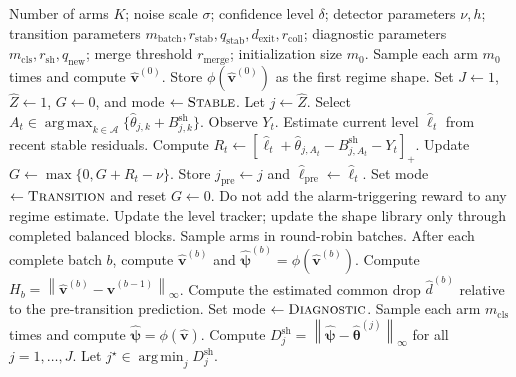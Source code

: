 \documentclass[11pt]{article}
\newcommand{\A}{\mathcal A}
\newcommand{\norm}[1]{\left\lVert #1 \right\rVert}
\newcommand{\pos}[1]{\left[#1\right]_{+}}
\DeclareMathOperator*{\argmax}{arg\,max}
\DeclareMathOperator*{\argmin}{arg\,min}
\begin{document}
\begin{algorithm}[t]
\caption{Level-Invariant Transition-Aware Recurrent UCB (LI-TAR-UCB)}
\label{alg:li_tar_ucb}
\begin{algorithmic}[1]
\Require Number of arms $K$; noise scale $\sigma$; confidence level $\delta$; detector parameters $\nu,h$; transition parameters $m_{\mathrm{batch}},r_{\mathrm{stab}},q_{\mathrm{stab}},d_{\mathrm{exit}},r_{\mathrm{coll}}$; diagnostic parameters $m_{\mathrm{cls}},r_{\mathrm{sh}},q_{\mathrm{new}}$; merge threshold $r_{\mathrm{merge}}$; initialization size $m_0$.
\State Sample each arm $m_0$ times and compute $\widehat{\bm v}^{(0)}$.
\State Store $\phi(\widehat{\bm v}^{(0)})$ as the first regime shape.
\State Set $J\gets 1$, $\widehat Z\gets 1$, $G\gets 0$, and mode $\gets\textsc{Stable}$.
        \State Let $j\gets\widehat Z$.
        \State Select $A_t\in\argmax_{k\in\A}\{\widehat\theta_{j,k}+B_{j,k}^{\mathrm{sh}}\}$.
        \State Observe $Y_t$.
        \State Estimate current level $\widehat\ell_t$ from recent stable residuals.
        \State Compute $R_t\gets\pos{\widehat\ell_t+\widehat\theta_{j,A_t}-B_{j,A_t}^{\mathrm{sh}}-Y_t}$.
        \State Update $G\gets\max\{0,G+R_t-\nu\}$.
            \State Store $j_{\mathrm{pre}}\gets j$ and $\widehat\ell_{\mathrm{pre}}\gets\widehat\ell_t$.
            \State Set mode $\gets\textsc{Transition}$ and reset $G\gets0$.
            \State Do not add the alarm-triggering reward to any regime estimate.
        \Else
            \State Update the level tracker; update the shape library only through completed balanced blocks.
        \EndIf
        \State Sample arms in round-robin batches.
        \State After each complete batch $b$, compute $\widehat{\bm v}^{(b)}$ and $\widehat{\bm\psi}^{(b)}=\phi(\widehat{\bm v}^{(b)})$.
        \State Compute $H_b=\norm{\widehat{\bm v}^{(b)}-\widehat{\bm v}^{(b-1)}}_{\infty}$.
        \State Compute the estimated common drop $\widehat d^{(b)}$ relative to the pre-transition prediction.
            \State Set mode $\gets\textsc{Diagnostic}$.
        \EndIf
        \State Sample each arm $m_{\mathrm{cls}}$ times and compute $\widehat{\bm\psi}=\phi(\widehat{\bm v})$.
        \State Compute $D_j^{\mathrm{sh}}=\norm{\widehat{\bm\psi}-\widehat{\bm\theta}^{(j)}}_{\infty}$ for all $j=1,\ldots,J$.
        \State Let $j^\star\in\argmin_j D_j^{\mathrm{sh}}$.

\end{algorithmic}
\end{algorithm}
\end{document}
